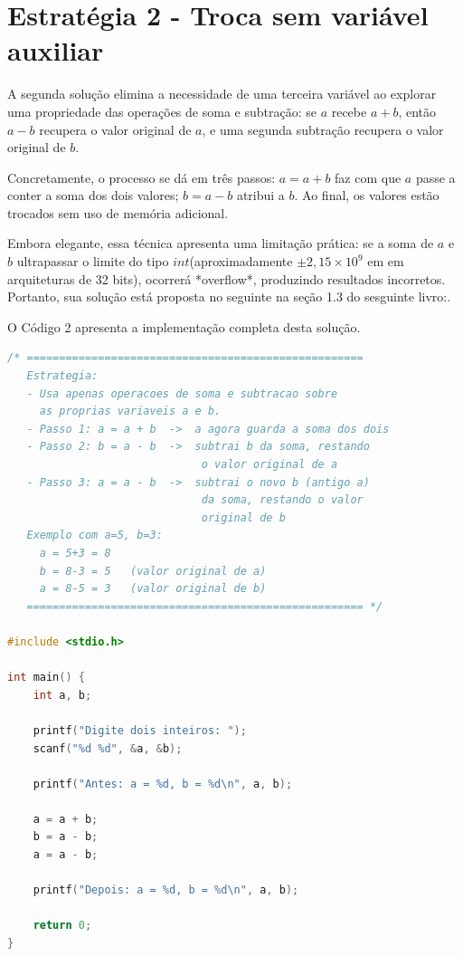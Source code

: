 \documentclass[12pt, a4paper]{article}
\begin{document}
    

\section*{Estratégia 2 - Troca sem variável auxiliar}

A segunda solução elimina a necessidade de uma terceira variável ao explorar uma 
propriedade das operações de soma e subtração: se $a$ recebe $a+b$, então $a-b$ 
recupera o valor original de $a$, e uma segunda subtração recupera o valor 
original de $b$.


Concretamente, o processo se dá em três passos: $a = a+b$ faz com que $a$ passe 
a conter a soma dos dois valores; $b = a-b$ atribui a $b$. Ao final, os valores 
estão trocados sem uso de memória adicional.


Embora elegante, essa técnica apresenta uma limitação prática: se a soma de $a$ 
e $b$ ultrapassar o limite do tipo $int$(aproximadamente $\pm2,15 \times 10^9$ 
em em arquiteturas de 32 bits), ocorrerá *overflow*, produzindo resultados 
incorretos. Portanto, sua solução está proposta no seguinte na seção 1.3 do 
sesguinte livro:\cite{knuth1997}.


O Código 2 apresenta a implementação completa desta solução.

\begin{lstlisting}[language=C, caption={Troca sem variável auxiliar}, label={lst:q2}]
/* ====================================================
   Estrategia:
   - Usa apenas operacoes de soma e subtracao sobre
     as proprias variaveis a e b.
   - Passo 1: a = a + b  ->  a agora guarda a soma dos dois
   - Passo 2: b = a - b  ->  subtrai b da soma, restando
                              o valor original de a
   - Passo 3: a = a - b  ->  subtrai o novo b (antigo a)
                              da soma, restando o valor
                              original de b
   Exemplo com a=5, b=3:
     a = 5+3 = 8
     b = 8-3 = 5   (valor original de a)
     a = 8-5 = 3   (valor original de b)
   ==================================================== */

#include <stdio.h>

int main() {
    int a, b;

    printf("Digite dois inteiros: ");
    scanf("%d %d", &a, &b);

    printf("Antes: a = %d, b = %d\n", a, b);

    a = a + b;
    b = a - b;
    a = a - b;

    printf("Depois: a = %d, b = %d\n", a, b);

    return 0;
}
\end{lstlisting}
\end{document}
